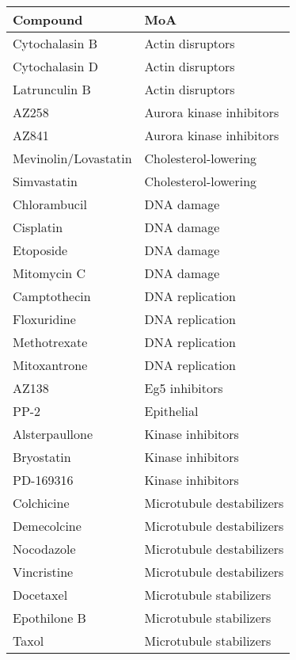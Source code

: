 \begin{table}[htbp]
    \centering
    \small
    \setlength\tabcolsep{6pt}
    \renewcommand{\arraystretch}{1.1}
    \begin{tabular}{ll}
        \toprule
        \textbf{Compound} & \textbf{MoA} \\
        \midrule
        Cytochalasin B & Actin disruptors \\
        Cytochalasin D & Actin disruptors \\
        Latrunculin B & Actin disruptors \\
        AZ258 & Aurora kinase inhibitors \\
        AZ841 & Aurora kinase inhibitors \\
        Mevinolin/Lovastatin & Cholesterol-lowering \\
        Simvastatin & Cholesterol-lowering \\
        Chlorambucil & DNA damage \\
        Cisplatin & DNA damage \\
        Etoposide & DNA damage \\
        Mitomycin C & DNA damage \\
        Camptothecin & DNA replication \\
        Floxuridine & DNA replication \\
        Methotrexate & DNA replication \\
        Mitoxantrone & DNA replication \\
        AZ138 & Eg5 inhibitors \\
        PP-2 & Epithelial \\
        Alsterpaullone & Kinase inhibitors \\
        Bryostatin & Kinase inhibitors \\
        PD-169316 & Kinase inhibitors \\
        Colchicine & Microtubule destabilizers \\
        Demecolcine & Microtubule destabilizers \\
        Nocodazole & Microtubule destabilizers \\
        Vincristine & Microtubule destabilizers \\
        Docetaxel & Microtubule stabilizers \\
        Epothilone B & Microtubule stabilizers \\
        Taxol & Microtubule stabilizers \\

\end{tabular}
\end{table}

